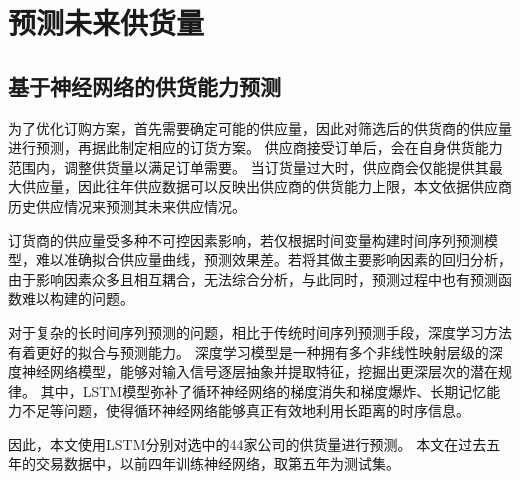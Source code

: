 
\section{预测未来供货量}
\subsection{基于神经网络的供货能力预测}

为了优化订购方案，首先需要确定可能的供应量，因此对筛选后的供货商的供应量进行预测，再据此制定相应的订货方案。
供应商接受订单后，会在自身供货能力范围内，调整供货量以满足订单需要。
当订货量过大时，供应商会仅能提供其最大供应量，因此往年供应数据可以反映出供应商的供货能力上限，本文依据供应商历史供应情况来预测其未来供应情况。

订货商的供应量受多种不可控因素影响，若仅根据时间变量构建时间序列预测模型，难以准确拟合供应量曲线，预测效果差。若将其做主要影响因素的回归分析，由于影响因素众多且相互耦合，无法综合分析，与此同时，预测过程中也有预测函数难以构建的问题\cite{李鹏2018基于长短期记忆的实时电价条件下智能电网短期负荷预测}。


对于复杂的长时间序列预测的问题，相比于传统时间序列预测手段，深度学习方法有着更好的拟合与预测能力。
深度学习模型是一种拥有多个非线性映射层级的深度神经网络模型，能够对输入信号逐层抽象并提取特征，挖掘出更深层次的潜在规律\cite{lecun2015deep}。
其中，LSTM模型弥补了循环神经网络的梯度消失和梯度爆炸、长期记忆能力不足等问题，使得循环神经网络能够真正有效地利用长距离的时序信息\cite{王鑫2018基于}。

因此，本文使用LSTM分别对选中的44家公司的供货量进行预测。
本文在过去五年的交易数据中，以前四年训练神经网络，取第五年为测试集。

